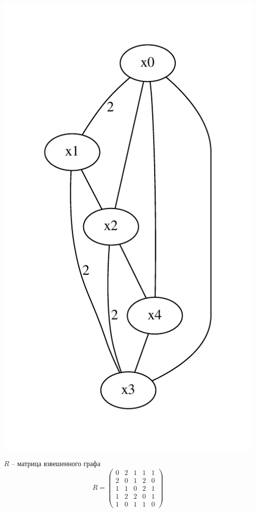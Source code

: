 \documentclass{article}
\begin{document}
	\includegraphics{lection5.1.pdf}
	
	$R$ -- матрица взвешенного графа
	$$
	R = \begin{pmatrix}
		0 & 2 & 1 & 1 & 1\\
		2 & 0 & 1 & 2 & 0\\
		1 & 1 & 0 & 2 & 1\\
		1 & 2 & 2 & 0 & 1\\
		1 & 0 & 1 & 1 & 0
	\end{pmatrix}
	$$
\end{document}

